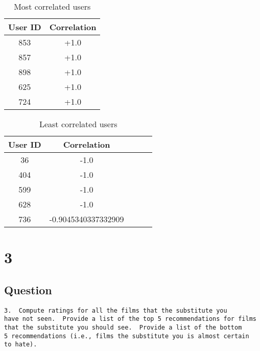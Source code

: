 \documentclass[letterpaper,11pt]{article}
\newcommand*{\srcPath}{../src}%
\begin{document}
\begin{table}[htb]
\centering
\begin{tabular}{ | c | c |}
\hline
\textbf{User ID} & \textbf{Correlation} \\
\hline
853 & +1.0 \\
\hline
857 & +1.0 \\
\hline
898 & +1.0 \\ 
\hline
625 & +1.0 \\
\hline
724 & +1.0 \\
\hline
\end{tabular}
\caption{Most correlated users}
\label{table:q2most}
\end{table}

\begin{table}[htb]
\centering
\begin{tabular}{ | c | c | c | | c | c |}
\hline
\textbf{User ID} & \textbf{Correlation} \\
\hline
36 & -1.0 \\
\hline
404 & -1.0 \\
\hline
599 & -1.0 \\ 
\hline
628 & -1.0 \\
\hline
736 & -0.9045340337332909 \\
\hline
\end{tabular}
\caption{Least correlated users}
\label{table:q2least}
\end{table}

\clearpage

 

\clearpage


\section*{3}

\subsection*{Question}

\begin{verbatim}
3.  Compute ratings for all the films that the substitute you
have not seen.  Provide a list of the top 5 recommendations for films
that the substitute you should see.  Provide a list of the bottom
5 recommendations (i.e., films the substitute you is almost certain
to hate).
\end{verbatim}
\end{document}
